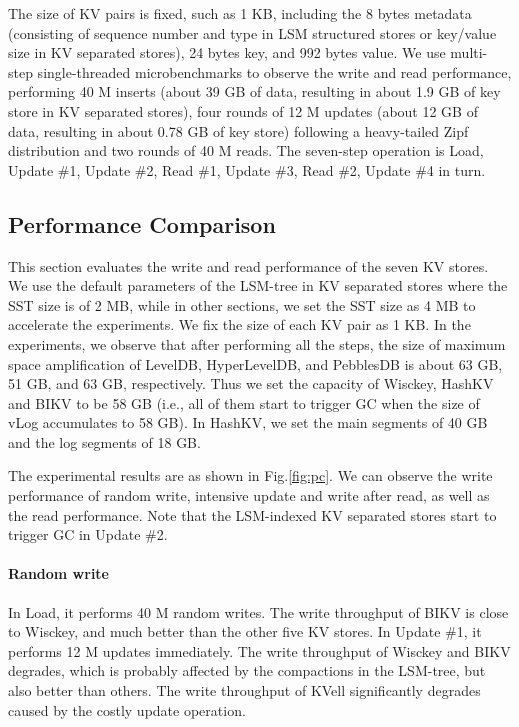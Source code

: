\documentclass[sigconf]{acmart}
\begin{document}
The size of KV pairs is fixed, such as 1 KB, including the 8 bytes metadata (consisting of sequence number and type in LSM structured stores or key/value size in KV separated stores), 24 bytes key, and 992 bytes value. We use multi-step single-threaded microbenchmarks to observe the write and read performance, performing 40 M inserts (about 39 GB of data, resulting in about 1.9 GB of key store in KV separated stores), four rounds of 12 M updates (about 12 GB of data, resulting in about 0.78 GB of key store) following a heavy-tailed Zipf distribution and two rounds of 40 M reads. The seven-step operation is Load, Update \#1, Update \#2, Read \#1, Update \#3, Read \#2, Update \#4 in turn. 

\subsection{Performance Comparison}
This section evaluates the write and read performance of the seven KV stores. We use the default parameters of the LSM-tree in KV separated stores where the SST size is of 2 MB, while in other sections, we set the SST size as 4 MB to accelerate the experiments. We fix the size of each KV pair as 1 KB. In the experiments, we observe that after performing all the steps, the size of maximum space amplification of LevelDB, HyperLevelDB, and PebblesDB is about 63 GB, 51 GB, and 63 GB, respectively. Thus we set the capacity of Wisckey, HashKV and BIKV to be 58 GB (i.e., all of them start to trigger GC when the size of vLog accumulates to 58 GB). In HashKV, we set the main segments of 40 GB and the log segments of 18 GB. 

The experimental results are as shown in Fig.\ref{fig:pc}. We can observe the write performance of random write, intensive update and write after read, as well as the read performance. Note that the LSM-indexed KV separated stores start to trigger GC in Update \#2.

\paragraph*{Random write}
In Load, it performs 40 M random writes. The write throughput of BIKV is close to Wisckey, and much better than the other five KV stores. In Update \#1, it performs 12 M updates immediately. The write throughput of Wisckey and BIKV degrades, which is probably affected by the compactions in the LSM-tree, but also better than others. The write throughput of KVell significantly degrades caused by the costly update operation.
\end{document}
